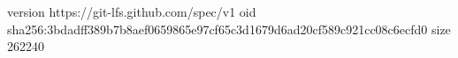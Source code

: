 version https://git-lfs.github.com/spec/v1
oid sha256:3bdadff389b7b8aef0659865e97cf65c3d1679d6ad20cf589c921cc08c6ecfd0
size 262240

